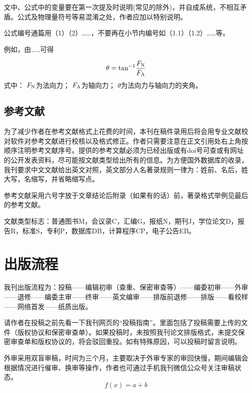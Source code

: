 \documentclass{kqdlxxb}
\begin{document}
文中、公式中的变量要在第一次提及时说明(常见的除外)，并自成系统，不相互矛盾。公式及物理量符号等易混淆之处，作者应加以特别说明。

公式编号通篇用（1）（2）……，不要再在小节内编号如（1.1）（1.2）……等。

例如，由……可得

\begin{equation} \label{eq:case-1}
  \theta={\rm tan}^{-1} \frac{F_{\rm N}}{F_{\rm A}}
\end{equation}
式中： $F_{\rm N}$为法向力； $F_{\rm A}$为轴向力； $\theta$为法向力与轴向力的夹角。

\subsection{参考文献}
为了减少作者在参考文献格式上花费的时间，本刊在稿件录用后将会用专业文献校对软件对参考文献进行校核以及格式修正。作者只需要注意在正文引用处右上角按顺序注明参考文献序号\parencite{刘炜201348,李志辉1996阿波罗指令舱稀薄气体动力学特征的蒙特卡罗数值模拟,庄逢甘2006未来空间飞行器的某些发展和空气动力学的任务}。提供的参考文献必须为已经出版或有doi号可查或有网址的公开发表资料，尽可能按文献类型给出所有的信息。为方便国外数据库的收录，我刊要求中文文献给出英文对照，英文部分人名著录规则一律为：姓前、名后，姓大写，名缩写，并省略缩写点。

参考文献采用六号字放于文章结论后附录（如果有的话）前，著录格式举例见最后的参考文献。

文献类型标志：普通图书M，会议录C，汇编G，报纸N，期刊J，学位论文D，报告R，标准S，专利P，数据库DB，计算程序CP，电子公告EB。

\section{出版流程}

我刊出版流程为：投稿——编辑初审（查重、保密审查等）——编委初审——外审——退修——编委主审——终审——英文编审——排版前退修——排版——看校样——网络首发——纸质出版。

请作者在投稿之前先看一下我刊网页的“投稿指南”。里面包括了投稿需要上传的文件（版权协议和保密审查单）。如果投稿时，未按照我刊论文排版格式，未提交保密审查单和版权协议的，将会驳回重投。如有特殊原因，可以投稿时留言说明。

外审采用双盲审稿，时间为三个月，主要取决于外审专家的审回快慢，期间编辑会根据情况进行催审、换审等操作，作者也可通过手机我刊微信公众号关注审稿状态。
\begin{equation} \label{eq:case-2}
  f(x)=a+b
\end{equation}
\end{document}
